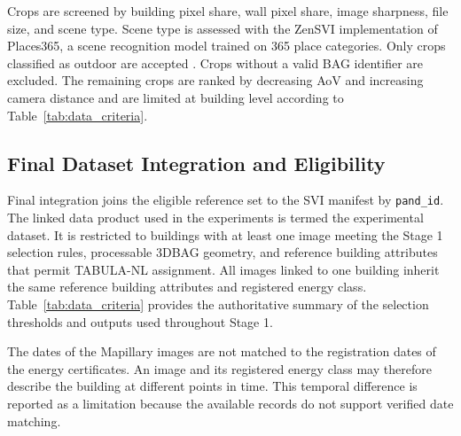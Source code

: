 Crops are screened by building pixel share, wall pixel share, image sharpness, file size, and scene type.
Scene type is assessed with the ZenSVI implementation of Places365, a scene recognition model trained on 365 place categories.
Only crops classified as outdoor are accepted \parencite{zhou2018places,ito_zensvi_2025}.
Crops without a valid BAG identifier are excluded.
The remaining crops are ranked by decreasing \ac{AoV} and increasing camera distance and are limited at building level according to Table~\ref{tab:data_criteria}.

\subsection{Final Dataset Integration and Eligibility}
\label{sec:svi_acquisition_filtering}
\label{sec:reference_data_integration}

Final integration joins the eligible reference set to the \ac{SVI} manifest by \texttt{pand\_id}.
The linked data product used in the experiments is termed the experimental dataset.
It is restricted to buildings with at least one image meeting the Stage 1 selection rules, processable 3DBAG geometry, and reference building attributes that permit TABULA-NL assignment.
All images linked to one building inherit the same reference building attributes and registered energy class.
Table~\ref{tab:data_criteria} provides the authoritative summary of the selection thresholds and outputs used throughout Stage 1.

The dates of the Mapillary images are not matched to the registration dates of the energy certificates.
An image and its registered energy class may therefore describe the building at different points in time.
This temporal difference is reported as a limitation because the available records do not support verified date matching.

